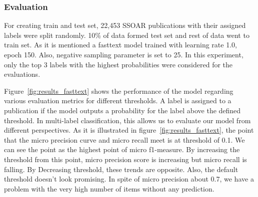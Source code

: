 \subsubsection{Evaluation}

For creating train and test set, 22,453 SSOAR publications with their assigned labels were split randomly. 10\% of data formed test set and rest of data went to train set. As it is mentioned a fasttext model trained with learning rate 1.0, epoch 150. Also, negative sampling parameter is set to 25.  In this experiment, only the top 3 labels with the highest probabilities were considered for the evaluations.

Figure~\ref{fig:results_fasttext} shows the performance of the model regarding various evaluation metrics for different thresholds. A label is assigned to a publication if the model outputs a probability for the label above the defined threshold. In multi-label classification, this allows us to evaluate our model from different perspectives. As it is illustrated in figure~\ref{fig:results_fasttext}, the point that the micro precision curve and micro recall meet is at threshold of 0.1. We can see the point as the highest point of micro f1-measure. By increasing the threshold from this point, micro precision score is increasing but micro recall is falling. By Decreasing threshold, these trends are opposite.  Also, the default threshold doesn't look promising. In spite of micro precision about 0.7, we have a problem with the very high number of items without any prediction. 


\begin{comment}

This graph shows the change of different evaluation metrics over different probability thresholds for generating the result. 
The threshold defines the minimum probability of a label which is leading to an assignment.

Orderly, micro precision and micro recall values are 0.5 for threshold 0.1
For this threshold, the model generates a prediction for all items and about half of the items have at least one correct prediction. 
All these metrics remain the same till threshold 0.2. Till threshold 0.6, we can see a dramatic increase in the micro precision and the number of items without any correct prediction. Both of these metrics pass 0.8. On the other hand, micro recall falls to the below of 0.2. In this case, selecting threshold seems hard task, since the conflict point of precision and recall is a threshold about 0.25 but both of these metrics at the point are not more than 0.3 and also we have more than 0.4 items with completely wrong predictions. Also, the default threshold doesn't look promising. In spite of micro precision about 0.7, we have a problem with the very high number of items without any prediction.
\end{comment}


